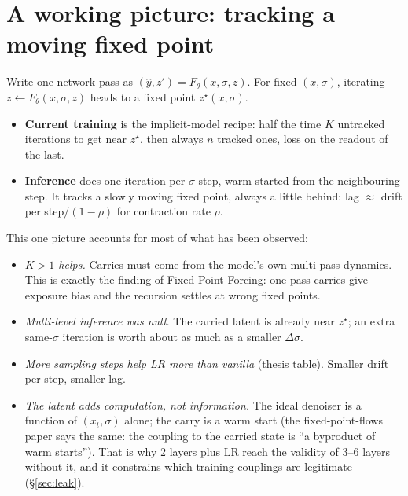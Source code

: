 \documentclass[11pt,a4paper]{article}
\begin{document}
\section{A working picture: tracking a moving fixed point}\label{sec:picture}

Write one network pass as $(\hat y, z') = F_\theta(x,\sigma,z)$. For fixed $(x,\sigma)$,
iterating $z \leftarrow F_\theta(x,\sigma,z)$ heads to a fixed point $z^\star(x,\sigma)$.

\begin{itemize}
  \item \textbf{Current training} is the implicit-model recipe: half the time $K$
        untracked iterations to get near $z^\star$, then always $n$ tracked ones, loss
        on the readout of the last.
  \item \textbf{Inference} does one iteration per $\sigma$-step, warm-started from the
        neighbouring step. It tracks a slowly moving fixed point, always a little
        behind: lag $\approx$ drift per step$/(1-\rho)$ for contraction rate $\rho$.
\end{itemize}

This one picture accounts for most of what has been observed:
\begin{itemize}
  \item \emph{$K{>}1$ helps.} Carries must come from the model's own multi-pass
        dynamics. This is exactly the finding of Fixed-Point Forcing: one-pass carries
        give exposure bias and the recursion settles at wrong fixed points.
  \item \emph{Multi-level inference was null.} The carried latent is already near
        $z^\star$; an extra same-$\sigma$ iteration is worth about as much as a smaller
        $\Delta\sigma$.
  \item \emph{More sampling steps help LR more than vanilla} (thesis table). Smaller
        drift per step, smaller lag.
  \item \emph{The latent adds computation, not information.} The ideal denoiser is a
        function of $(x_t,\sigma)$ alone; the carry is a warm start (the fixed-point-flows
        paper says the same: the coupling to the carried state is ``a byproduct of warm
        starts''). That is why 2 layers plus LR reach the validity of 3--6 layers
        without it, and it constrains which training couplings are legitimate
        (\S\ref{sec:leak}).
\end{itemize}
\end{document}
